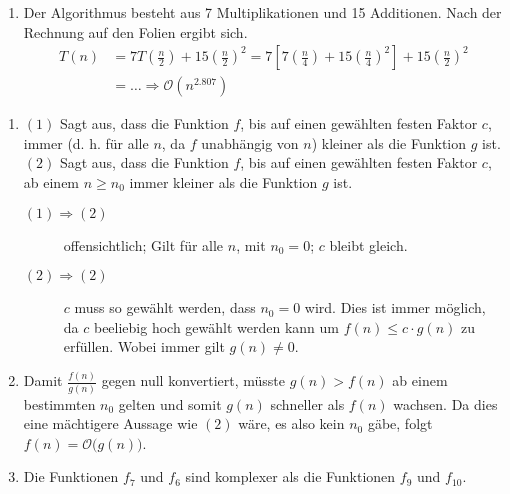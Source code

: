\documentclass[a4paper,11pt]{article}             %
\begin{document}
\begin{enumerate}
\item
Der Algorithmus besteht aus 7 Multiplikationen und 15 Additionen. Nach der Rechnung auf den Folien ergibt sich.
\begin{equation*}
\begin{array}{rl}
T(n) & = 7 T \left ( \frac{n}{2} \right ) + 15 { \left ( \frac{n}{2} \right ) }^2 = 7 \left [ 7 \left ( \frac{n}{4} \right ) + 15 { \left ( \frac{n}{4} \right ) }^2 \right ] + 15 { \left ( \frac{n}{2} \right ) }^2\\
& = \dots \Rightarrow \mathcal{O}(n^{2.807})
\end{array}
\end{equation*}

\end{enumerate}


\begin{enumerate}
\item
$(1)$ Sagt aus, dass die Funktion $f$, bis auf einen gewählten festen Faktor $c$, immer (d. h. für alle $n$, da $f$ unabhängig von $n$) kleiner als die Funktion $g$ ist.\\
$(2)$ Sagt aus, dass die Funktion $f$, bis auf einen gewählten festen Faktor $c$, ab einem $n \geq n_0$ immer kleiner als die Funktion $g$ ist.\\
\begin{description}
\item [$(1) \Rightarrow (2)$] offensichtlich; Gilt für alle $n$, mit $n_0 = 0$; $c$ bleibt gleich.
\item [$(2) \Rightarrow (2)$] $c$ muss so gewählt werden, dass $n_0=0$ wird. Dies ist immer möglich, da $c$ beeliebig hoch gewählt werden kann um $f(n) \leq c \cdot g(n)$ zu erfüllen. Wobei immer gilt $g(n) \neq 0$.

\end{description}

\item Damit $\frac{f(n)}{g(n)}$ gegen null konvertiert, müsste $g(n) > f(n)$ ab einem bestimmten $n_0$ gelten und somit $g(n)$ schneller als $f(n)$ wachsen. Da dies eine mächtigere Aussage wie $(2)$ wäre, es also kein $n_0$ gäbe, folgt $f(n) = \mathcal{O} \big (g(n) \big )$.

\item
Die Funktionen $f_7$ und $f_6$ sind komplexer als die Funktionen $f_9$ und $f_{10}$.
\end{enumerate}
\end{document}
